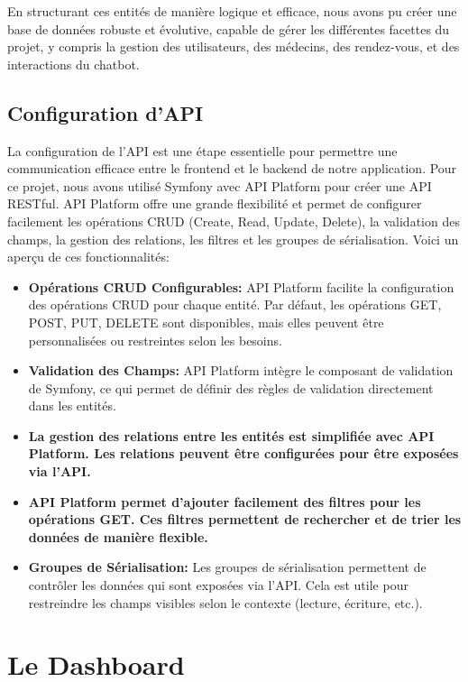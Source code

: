 En structurant ces entités de manière logique et efficace, nous avons pu créer une base de données robuste et évolutive, capable de gérer les différentes facettes du projet, y compris la gestion des utilisateurs, des médecins, des rendez-vous, et des interactions du chatbot.

\subsection{Configuration d'API}

\hspace{16pt}La configuration de l'API est une étape essentielle pour permettre une communication efficace entre le frontend et le backend de notre application. Pour ce projet, nous avons utilisé Symfony avec API Platform pour créer une API RESTful. API Platform offre une grande flexibilité et permet de configurer facilement les opérations CRUD (Create, Read, Update, Delete), la validation des champs, la gestion des relations, les filtres et les groupes de sérialisation. Voici un aperçu de ces fonctionnalités:

\begin{itemize}
  \item \textbf{Opérations CRUD Configurables: }API Platform facilite la configuration des opérations CRUD pour chaque entité. Par défaut, les opérations GET, POST, PUT, DELETE sont disponibles, mais elles peuvent être personnalisées ou restreintes selon les besoins.
  \item \textbf{Validation des Champs: }API Platform intègre le composant de validation de Symfony, ce qui permet de définir des règles de validation directement dans les entités.
  \item \textbf{La gestion des relations entre les entités est simplifiée avec API Platform. Les relations peuvent être configurées pour être exposées via l'API.}
  \item \textbf{API Platform permet d'ajouter facilement des filtres pour les opérations GET. Ces filtres permettent de rechercher et de trier les données de manière flexible.}
  \item \textbf{Groupes de Sérialisation: }Les groupes de sérialisation permettent de contrôler les données qui sont exposées via l'API. Cela est utile pour restreindre les champs visibles selon le contexte (lecture, écriture, etc.).
\end{itemize}

\section{Le Dashboard}

